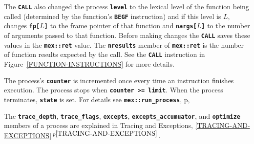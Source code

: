 \documentclass[12pt]{article}
\newcommand{\TT}[1]{{\tt \bfseries #1}}
\newcommand{\itemref}[1]{\ref{#1}$\,^{p\pageref{#1}}$}
\newcommand{\pagref}[1]{p\pageref{#1}}
\begin{document}
The \TT{CALL} also changed the process \TT{level} to the lexical level
of the function being called (determined by the function's \TT{BEGF}
instruction) and if this level is $L$, changes \TT{fp[$L$]} to the
frame pointer of that function and \TT{nargs[$L$]} to the number of
arguments passed to that function.  Before making changes the \TT{CALL}
saves these values in the \TT{mex::ret} value.
The \TT{nresults} member of \TT{mex::ret}
is the number of function results expected by the call.
See the \TT{CALL} instruction in Figure~\ref{FUNCTION-INSTRUCTIONS}
for more details.

The process's \TT{counter} is incremented once every time an instruction
finishes execution.  The process stops when \TT{counter >= limit}. 
When the process terminates, \TT{state} is set.  For details
see \TT{mex::run\_process}, \pagref{MEX::RUN_PROCESS},

The \TT{trace\_depth}, \TT{trace\_flags}, \TT{excepts},
\TT{excepts\_accumuator}, and \TT{optimize}
members of a process
are explained in Tracing and Exceptions, \itemref{TRACING-AND-EXCEPTIONS}.

\pagebreak
\end{document}
